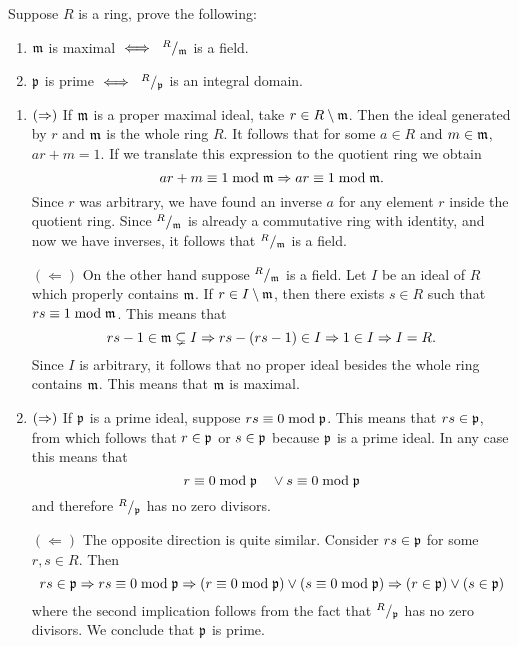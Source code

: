 \documentclass[12pt]{memoir}
\begin{document}
\begin{Ej}[2.1.2]
  Suppose $R$ is a ring, prove the following:
  \vspace{-0.4em}
  \begin{enumerate}
    \itemsep=-0.4em
    \item $\mathfrak{m}$ is maximal $\iff\ \quot{R}{\lie m}$ is a field. 
    \item $\mathfrak{p}$ is prime $\iff\ \quot{R}{\lie p}$ is an integral domain. 
  \end{enumerate}
\end{Ej}
\begin{ptcbr}
  \begin{enumerate}
    \itemsep=-0.4em
    \item $(\Rightarrow)$ If $\mathfrak{m}$ is a proper maximal ideal, take $r\in R\setminus\mathfrak{m}$. Then the ideal generated by $r$ and $\mathfrak{m}$ is the whole ring $R$. It follows that for some $a\in R$ and $m\in\mathfrak{m}$, $ar+m=1$. If we translate this expression to the quotient ring we obtain
    $$ar+m\equiv 1\bmod \mathfrak{m}\Rightarrow ar\equiv 1\bmod\mathfrak{m}.$$ %
    Since $r$ was arbitrary, we have found an inverse $a$ for any element $r$ inside the quotient ring. Since $\quot{R}{\lie m}$ is already a commutative ring with identity, and now we have inverses, it follows that $\quot{R}{\lie m}$ is a field.\par 
    $(\Leftarrow)$ On the other hand suppose $\quot{R}{\lie m}$ is a field. Let $I$ be an ideal of $R$ which properly contains $\mathfrak{m}$. If $r\in I\setminus\mathfrak{m}$, then there exists $s\in R$ such that $rs\equiv 1\bmod\mathfrak{m}$. This means that 
    $$rs-1\in\mathfrak{m}\subsetneq I\Rightarrow rs-(rs-1)\in I\Rightarrow 1\in I\Rightarrow I=R.$$
    Since $I$ is arbitrary, it follows that no proper ideal besides the whole ring contains $\mathfrak{m}$. This means that $\mathfrak{m}$ is maximal.
    \item $(\Rightarrow)$ If $\mathfrak{p}$ is a prime ideal, suppose $rs\equiv 0\bmod\mathfrak{p}$. This means that $rs\in\mathfrak{p}$, from which follows that $r\in\mathfrak{p}$ or $s\in\mathfrak{p}$ because $\mathfrak{p}$ is a prime ideal. In any case this means that
    $$r\equiv 0\bmod\mathfrak{p}\quad\lor s\equiv 0\bmod\mathfrak{p}$$
    and therefore $\quot{R}{\lie p}$ has no zero divisors.\par
    $(\Leftarrow)$ The opposite direction is quite similar. Consider $rs\in\mathfrak{p}$ for some $r,s\in R$. Then 
    $$rs\in\mathfrak{p}\Rightarrow rs\equiv 0\bmod\mathfrak{p}\Rightarrow (r\equiv 0\bmod\mathfrak{p})\lor(s\equiv 0\bmod\mathfrak{p})\Rightarrow(r\in\mathfrak{p})\lor(s\in\mathfrak{p})$$
    where the second implication follows from the fact that $\quot{R}{\lie p}$ has no zero divisors. We conclude that $\mathfrak{p}$ is prime.
  \end{enumerate}
\end{ptcbr}
\end{document}
